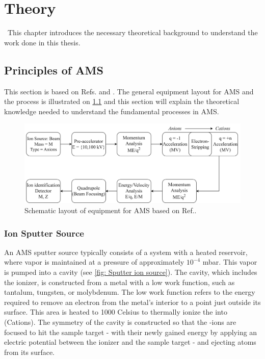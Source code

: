 \chapter{Theory}\
This chapter introduces the necessary theoretical background to
understand the work done in this thesis.



\section{Principles of AMS}
This section is based on Refs.\cite{schuur2013radiocarbon} and  \cite{tuniz1998ams}. The general equipment layout for AMS and the process is illustrated on \cref{fig:AMS} and this section will explain the theoretical knowledge needed to understand the fundamental processes in AMS.
\begin{figure}[ht]
    \centering
    \includegraphics[width=\textwidth]{B/AMS.png}
    \caption{Schematic layout of equipment for AMS based on Ref.\cite{tuniz1998ams}.}
    \label{fig:AMS}
\end{figure}

\subsection{Ion Sputter Source}
An AMS sputter source typically consists of a system with a heated  reservoir, where  vapor is maintained at a pressure of approximately $10^{-4}$ mbar. This vapor is pumped into a cavity (see \cref{fig: Sputter ion source}). The cavity, which includes the ionizer, is constructed from a metal with a low work function, such as tantalum, tungsten, or molybdenum. The low work function refers to the energy required to remove an electron from the metal's interior to a point just outside its surface. This area is heated to 1000 Celsius to thermally ionize the  into  (Cations). The symmetry of the cavity is constructed so that the -ions are focused to hit the sample target - with
their newly gained energy by applying an electric potential between the ionizer and the sample target - and ejecting atoms from its surface.

